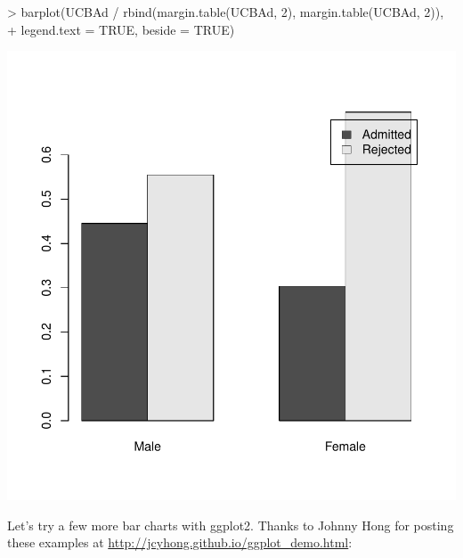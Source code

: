 \documentclass[12pt,letterpaper,final]{article}
\begin{document}
\begin{Schunk}
\begin{Sinput}
> barplot(UCBAd / rbind(margin.table(UCBAd, 2), margin.table(UCBAd, 2)), 
+   legend.text = TRUE, beside = TRUE)
\end{Sinput}
\end{Schunk}
\includegraphics{lect_main-015}


Let's try a few more bar charts with ggplot2. Thanks to Johnny Hong for 
posting these examples at \url{http://jcyhong.github.io/ggplot_demo.html}:
\end{document}
